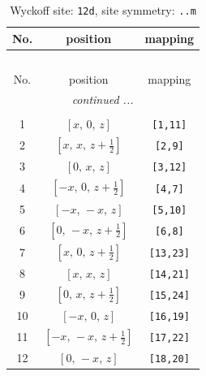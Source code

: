 \documentclass[fleqn,8pt]{jsarticle}
\begin{document}
\begin{longtable}{ccc}
\caption{Wyckoff site: {\tt 12d}, site symmetry: {\tt ..m}}
 \\
 \hline \hline
No. & position & mapping \\ \hline \endfirsthead

\multicolumn{2}{l}{\tablename\ \thetable{}} \\
 \hline \hline
No. & position & mapping \\ \hline \endhead

 \hline \hline
\multicolumn{2}{r}{\footnotesize\it continued ...} \\ \endfoot

 \hline \hline
\multicolumn{2}{r}{} \\ \endlastfoot

1 & $\left[ x,\, 0,\, z \right]$ & {\tt [1,11]} \\ \hline
2 & $\left[ x,\, x,\, z + \frac{1}{2} \right]$ & {\tt [2,9]} \\ \hline
3 & $\left[ 0,\, x,\, z \right]$ & {\tt [3,12]} \\ \hline
4 & $\left[ - x,\, 0,\, z + \frac{1}{2} \right]$ & {\tt [4,7]} \\ \hline
5 & $\left[ - x,\, - x,\, z \right]$ & {\tt [5,10]} \\ \hline
6 & $\left[ 0,\, - x,\, z + \frac{1}{2} \right]$ & {\tt [6,8]} \\ \hline
7 & $\left[ x,\, 0,\, z + \frac{1}{2} \right]$ & {\tt [13,23]} \\ \hline
8 & $\left[ x,\, x,\, z \right]$ & {\tt [14,21]} \\ \hline
9 & $\left[ 0,\, x,\, z + \frac{1}{2} \right]$ & {\tt [15,24]} \\ \hline
10 & $\left[ - x,\, 0,\, z \right]$ & {\tt [16,19]} \\ \hline
11 & $\left[ - x,\, - x,\, z + \frac{1}{2} \right]$ & {\tt [17,22]} \\ \hline
12 & $\left[ 0,\, - x,\, z \right]$ & {\tt [18,20]} \\
\end{longtable}
\renewcommand{\arraystretch}{1.2}
\end{document}
